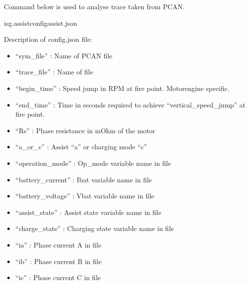 \documentclass[letterpaper,10pt,english]{sphinxmanual}
\begin{document}
\sphinxAtStartPar
Command below is used to analyse trace taken from PCAN.
\def\sphinxLiteralBlockLabel{\label{\detokenize{assist:id1}}}
\begin{sphinxVerbatim}[commandchars=\\\{\}]
isg.assist\PYGZhy{}\PYGZhy{}configassist.json
\end{sphinxVerbatim}

\sphinxAtStartPar
Description of config.json file:
\begin{itemize}
\item {} 
\sphinxAtStartPar
“sym\_file” : Name of PCAN  file

\item {} 
\sphinxAtStartPar
“trace\_file” : Name of  file

\item {} 
\sphinxAtStartPar
“begin\_time” : Speed jump in RPM at fire point. Motor\sphinxhyphen{}engine specific.

\item {} 
\sphinxAtStartPar
“end\_time” : Time in seconds required to achieve “vertical\_speed\_jump” at fire point.

\item {} 
\sphinxAtStartPar
“Rs” : Phase resistance in mOhm of the motor

\item {} 
\sphinxAtStartPar
“a\_or\_c” : Assist “a” or charging mode “c”

\item {} 
\sphinxAtStartPar
“operation\_mode” : Op\_mode variable name in  file

\item {} 
\sphinxAtStartPar
“battery\_current” : Ibat variable name in  file

\item {} 
\sphinxAtStartPar
“battery\_voltage” : Vbat variable name in  file

\item {} 
\sphinxAtStartPar
“assist\_state” : Assist state variable name in  file

\item {} 
\sphinxAtStartPar
“charge\_state” : Charging state variable name in  file

\item {} 
\sphinxAtStartPar
“ia” : Phase current A in  file

\item {} 
\sphinxAtStartPar
“ib” : Phase current B in  file

\item {} 
\sphinxAtStartPar
“ic” : Phase current C in  file

\end{itemize}
\end{document}
